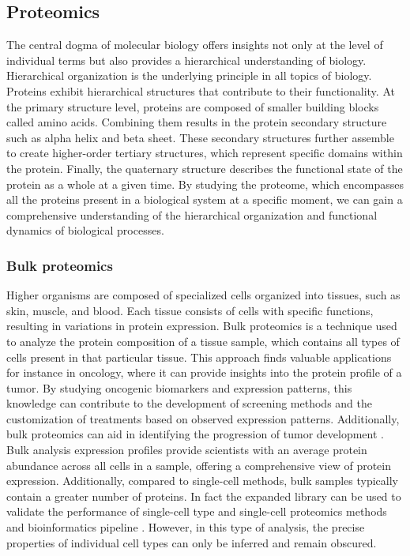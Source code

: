 \documentclass[
]{article}
\begin{document}
\hypertarget{proteomics}{%
\subsection{Proteomics}\label{proteomics}}

The central dogma of molecular biology offers insights not only at the
level of individual terms but also provides a hierarchical understanding
of biology. Hierarchical organization is the underlying principle in all
topics of biology. Proteins exhibit hierarchical structures that
contribute to their functionality. At the primary structure level,
proteins are composed of smaller building blocks called amino acids.
Combining them results in the protein secondary structure such as alpha
helix and beta sheet. These secondary structures further assemble to
create higher-order tertiary structures, which represent specific
domains within the protein. Finally, the quaternary structure describes
the functional state of the protein as a whole at a given time. By
studying the proteome, which encompasses all the proteins present in a
biological system at a specific moment, we can gain a comprehensive
understanding of the hierarchical organization and functional dynamics
of biological processes.

\hypertarget{bulk-proteomics}{%
\subsubsection{Bulk proteomics}\label{bulk-proteomics}}

Higher organisms are composed of specialized cells organized into
tissues, such as skin, muscle, and blood. Each tissue consists of cells
with specific functions, resulting in variations in protein expression.
Bulk proteomics is a technique used to analyze the protein composition
of a tissue sample, which contains all types of cells present in that
particular tissue. This approach finds valuable applications for
instance in oncology, where it can provide insights into the protein
profile of a tumor. By studying oncogenic biomarkers and expression
patterns, this knowledge can contribute to the development of screening
methods and the customization of treatments based on observed expression
patterns. Additionally, bulk proteomics can aid in identifying the
progression of tumor development \citep{Kwon2021}. Bulk analysis
expression profiles provide scientists with an average protein abundance
across all cells in a sample, offering a comprehensive view of protein
expression. Additionally, compared to single-cell methods, bulk samples
typically contain a greater number of proteins. In fact the expanded
library can be used to validate the performance of single-cell type and
single-cell proteomics methods and bioinformatics pipeline
\citep{Schoof2021}. However, in this type of analysis, the precise
properties of individual cell types can only be inferred and remain
obscured.
\end{document}

